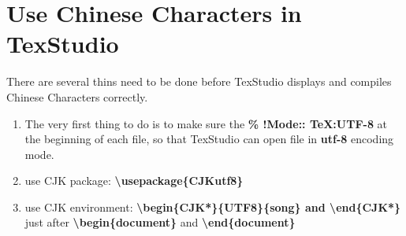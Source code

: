 
\chapter{Use Chinese Characters in TexStudio}
There are several thins need to be done before TexStudio displays and compiles Chinese Characters correctly.

\begin{enumerate}
	\item The very first thing to do is to make sure the \textbf{\% !Mode:: \textquotesingle\textquotesingle TeX:UTF-8\textquotesingle\textquotesingle} at the beginning of each file, so that TexStudio can open file in \textbf{utf-8} encoding mode.
	\item use CJK package: \textbf{\textbackslash usepackage\{CJKutf8\}}
	\item use CJK environment:\textbf{ \textbackslash begin\{CJK*\}\{UTF8\}\{song\} and \textbackslash end\{CJK*\}} just after \textbf{\textbackslash begin\{document\}} and \textbf{\textbackslash end\{document\}}
		
\end{enumerate}
